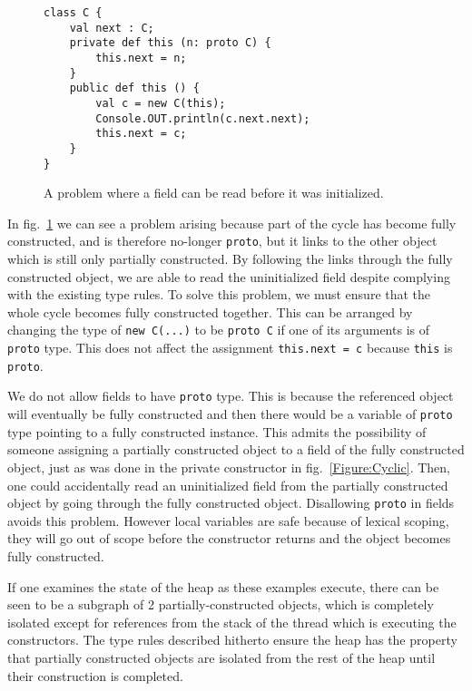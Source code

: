 \begin{figure}
\begin{lstlisting}
class C {
    val next : C;
    private def this (n: proto C) {
        this.next = n;
    }
    public def this () {
        val c = new C(this);
        Console.OUT.println(c.next.next);
        this.next = c;
    }
}   
\end{lstlisting}
\caption{A problem where a field can be read before it was initialized.}
\label{Figure:Problem1}
\end{figure}

In fig.~\ref{Figure:Problem1} we can see a problem arising because part of the
cycle has become fully constructed, and is therefore no-longer \texttt{proto},
but it links to the other object which is still only partially constructed.  By
following the links through the fully constructed object, we are able to read
the uninitialized field despite complying with the existing type rules.  To
solve this problem, we must ensure that the whole cycle becomes fully
constructed together.  This can be arranged by changing the type of \texttt{new
C(...)} to be \texttt{proto C} if one of its arguments is of \texttt{proto}
type.  This does not affect the assignment \texttt{this.next = c} because
\texttt{this} is \texttt{proto}.

We do not allow fields to have \texttt{proto} type.  This is because the
referenced object will eventually be fully constructed and then there would be
a variable of \texttt{proto} type pointing to a fully constructed instance.
This admits the possibility of someone assigning a partially constructed object
to a field of the fully constructed object, just as was done in the private
constructor in fig.~\ref{Figure:Cyclic}.  Then, one could accidentally read an
uninitialized field from the partially constructed object by going through the
fully constructed object.  Disallowing \texttt{proto} in fields avoids this
problem.  However local variables are safe because of lexical scoping, they
will go out of scope before the constructor returns and the object becomes
fully constructed.

If one examines the state of the heap as these examples execute, there can be
seen to be a subgraph of 2 partially-constructed objects, which is completely
isolated except for references from the stack of the thread which is executing
the constructors.  The type rules described hitherto ensure the heap has the
property that partially constructed objects are isolated from the rest of the
heap until their construction is completed.

